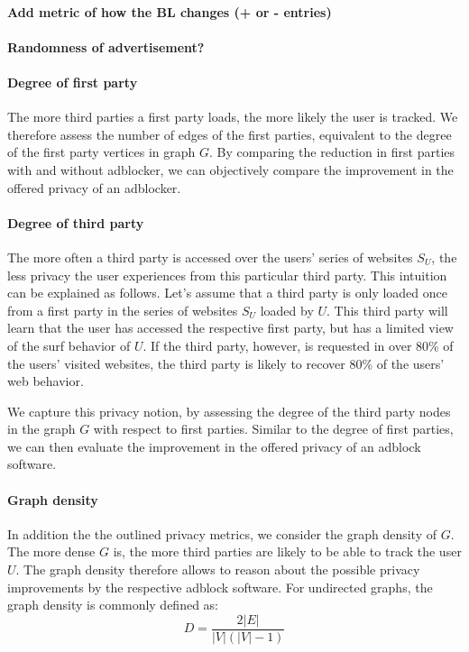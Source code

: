 \documentclass{sig-alternate}
\begin{document}
\paragraph{Add metric of how the BL changes (+ or - entries)}
\paragraph{Randomness of advertisement?}

\paragraph{Degree of first party}
The more third parties a first party loads, the more likely the user is tracked. We therefore assess the number of edges of the first parties, equivalent to the degree of the first party vertices in graph $G$. By comparing the reduction in first parties with and without adblocker, we can objectively compare the improvement in the offered privacy of an adblocker.

\paragraph{Degree of third party}
The more often a third party is accessed over the users' series of websites $S_U$, the less privacy the user experiences from this particular third party. This intuition can be explained as follows. Let's assume that a third party is only loaded once from a first party in the series of websites $S_U$ loaded by $U$. This third party will learn that the user has accessed the respective first party, but has a limited view of the surf behavior of $U$. If the third party, however, is requested in over 80\% of the users' visited websites, the third party is likely to recover 80\% of the users' web behavior.

We capture this privacy notion, by assessing the degree of the third party nodes in the graph $G$ with respect to first parties.
Similar to the degree of first parties, we can then evaluate the improvement in the offered privacy of an adblock software.

\paragraph{Graph density}
In addition the the outlined privacy metrics, we consider the graph density of $G$. The more dense $G$ is, the more third parties are likely to be able to track the user $U$. The graph density therefore allows to reason about the possible privacy improvements by the respective adblock software. For undirected graphs, the graph density is commonly defined as:
\begin{equation}
D = \frac{2 |E|}{|V|(|V|-1)}
\end{equation}
\end{document}
